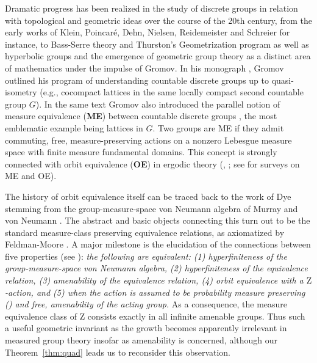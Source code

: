 \documentclass[11pt]{amsart}
\theoremstyle{definition}
\theoremstyle{plain}
\newcommand{\<}{\langle}
\renewcommand{\>}{\rangle}
\newcommand{\Z}{\bm{\mathrm{Z}}}
\newcommand{\define}[1]{\textbf{#1}}
\newcommand{\pmp}{\text{p.m.p.}}
\begin{document}
Dramatic progress has been realized in the study of discrete groups in relation with topological and geometric ideas over the course of the 20th century, from the early works of Klein, Poincar\'e, Dehn, Nielsen, Reidemeister and Schreier for instance, to Bass-Serre theory and Thurston's Geometrization program as well as hyperbolic groups and the emergence of geometric group theory as a distinct area of mathematics under the impulse of Gromov.
In his monograph \cite{Gro93}, Gromov outlined his program of understanding countable discrete groups up to quasi-isometry (e.g., cocompact lattices in the same locally compact second countable group $G$).
In the same text Gromov also introduced the parallel notion of measure equivalence (\define{ME}) between countable discrete groups \cite[0.5.E]{Gro93}, the most emblematic example being lattices in $G$.
Two groups are ME if they admit commuting, free, measure-preserving actions on a nonzero Lebesgue measure space with finite measure fundamental domains.
This concept is strongly connected with orbit equivalence (\define{OE}) in ergodic theory (\cite{Furman1999}, \cite[Th. 2.3]{Gab02b}; see \cite{Ga05,Furman2011} for surveys on ME and OE).


The history of orbit equivalence itself can be traced back to the work of Dye \cite{Dye59,Dye63} stemming from the group-measure-space von Neumann algebra of Murray and von Neumann \cite{MvN36}. The abstract and basic objects connecting this turn out to be the standard measure-class preserving equivalence relations, as axiomatized by Feldman-Moore \cite{FM77}.
A major milestone is the elucidation of the connections between five properties (see \cite{Connes-1976,Connes-Krieger-1977,OW80, CFW81}):
{\em the following are equivalent: (1)  hyperfiniteness of the group-measure-space von Neumann algebra, (2)  hyperfiniteness of the equivalence relation, (3) amenability of the equivalence relation, (4) orbit equivalence with a $\Z$-action, and (5) when the action is assumed to be probability measure preserving (\define{\pmp}) and free, amenability of the acting group.}
As a consequence, the measure equivalence class of $\Z$ consists exactly in all infinite amenable groups. Thus such a useful geometric invariant as the growth becomes apparently irrelevant in measured group theory insofar as amenability is concerned, although our Theorem~\ref{thm:quad} leads us to reconsider this observation.
\end{document}
